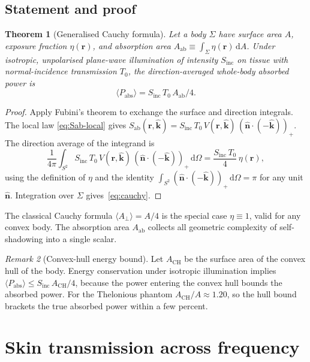 \documentclass[journal,twocolumn,10pt]{IEEEtran}
\theoremstyle{plain}
\newtheorem{theorem}{Theorem}
\theoremstyle{remark}
\newtheorem{remark}[theorem]{Remark}
\newcommand{\khat}{\hat{\bm{k}}}
\newcommand{\nhat}{\hat{\bm{n}}}
\newcommand{\rr}{\mathbf{r}}
\newcommand{\Sinc}{S_{\mathrm{inc}}}
\newcommand{\Sab}{S_{\mathrm{ab}}}
\newcommand{\Aab}{A_{\mathrm{ab}}}
\newcommand{\Aperp}{A_\perp}
\newcommand{\diff}{\mathrm{d}}
\newcommand{\pospart}[1]{\left(#1\right)_{+}}
\newcommand{\Vis}{V}
\begin{document}
\subsection{Statement and proof}

\begin{theorem}[Generalised Cauchy formula]\label{thm:cauchy}
Let a body $\Sigma$ have surface area $A$, exposure fraction
$\eta(\rr)$, and absorption area
$\Aab \equiv \int_\Sigma \eta(\rr)\,\diff A$. Under isotropic,
unpolarised plane-wave illumination of intensity $\Sinc$ on tissue
with normal-incidence transmission $T_0$, the direction-averaged
whole-body absorbed power is
\begin{equation}\label{eq:cauchy}
  \langle P_{\mathrm{abs}} \rangle = \Sinc\,T_0\,\Aab/4.
\end{equation}
\end{theorem}

\begin{proof}
Apply Fubini's theorem to exchange the surface and direction
integrals. The local law \eqref{eq:Sab-local} gives
$\Sab(\rr,\khat) = \Sinc\,T_0\,\Vis(\rr,\khat)\,
\pospart{\nhat\cdot(-\khat)}$. The direction average of the
integrand is
\[
  \frac{1}{4\pi}\int_{S^2}
  \Sinc\,T_0\,\Vis(\rr,\khat)\,\pospart{\nhat\cdot(-\khat)}\,\diff\Omega
  = \frac{\Sinc\,T_0}{4}\,\eta(\rr),
\]
using the definition of $\eta$ and the identity
$\int_{S^2}\pospart{\nhat\cdot(-\khat)}\,\diff\Omega = \pi$ for any unit
$\nhat$. Integration over $\Sigma$ gives~\eqref{eq:cauchy}.
\end{proof}

The classical Cauchy formula $\langle\Aperp\rangle = A/4$ is the
special case $\eta \equiv 1$, valid for any convex body. The
absorption area $\Aab$ collects all geometric complexity of self-
shadowing into a single scalar.

\begin{remark}[Convex-hull energy bound]\label{rem:hull}
Let $A_{\mathrm{CH}}$ be the surface area of the convex hull of the
body. Energy conservation under isotropic illumination implies
$\langle P_{\mathrm{abs}} \rangle \leq \Sinc\,A_{\mathrm{CH}}/4$,
because the power entering the convex hull bounds the absorbed power.
For the Thelonious phantom $A_{\mathrm{CH}}/A \approx 1.20$, so the
hull bound brackets the true absorbed power within a few percent.
\end{remark}


\section{Skin transmission across frequency}\label{sec:Tbar}
\end{document}
